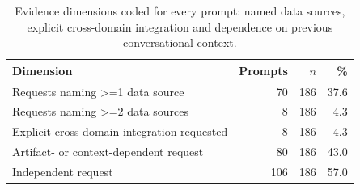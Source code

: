 \begin{table}[htbp]
\centering
\caption{Evidence dimensions coded for every prompt: named data sources, explicit cross-domain integration and dependence on previous conversational context.}
\label{tab:s5-evidence-dimensions}
\begin{tabular}{lrrr}
\toprule
Dimension & Prompts & $n$ & \% \\
\midrule
Requests naming >=1 data source & 70 & 186 & 37.6 \\
Requests naming >=2 data sources & 8 & 186 & 4.3 \\
Explicit cross-domain integration requested & 8 & 186 & 4.3 \\
Artifact- or context-dependent request & 80 & 186 & 43.0 \\
Independent request & 106 & 186 & 57.0 \\
\bottomrule
\end{tabular}
\par{}
\end{table}
